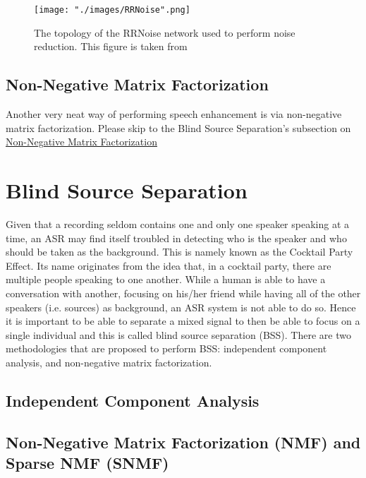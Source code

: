 \begin{figure}[H]
\begin{center}
    \texttt{[image: "./images/RRNoise".png]}
    \caption{The topology of the RRNoise network used to perform noise reduction. This figure is taken from \cite{rrnoise}}
    \label{fig::RRNoisearch}
\end{center}
\end{figure}

\subsection{Non-Negative Matrix Factorization}
Another very neat way of performing speech enhancement is via non-negative matrix factorization. Please skip to the Blind Source Separation's subsection on \hyperref[sec:NMF]{Non-Negative Matrix Factorization} \cite{spectralclustering}

\section{Blind Source Separation}
Given that a recording seldom contains one and only one speaker speaking at a time, an ASR may find itself troubled in detecting who is the speaker and who should be taken as the background. This is namely known as the Cocktail Party Effect. Its name originates from the idea that, in a cocktail party, there are multiple people speaking to one another. While a human is able to have a conversation with another, focusing on his/her friend while having all of the other speakers (i.e. sources) as background, an ASR system is not able to do so. Hence it is important to be able to separate a mixed signal to then be able to focus on a single individual and this is called blind source separation (BSS). There are two methodologies that are proposed to perform BSS: independent component analysis, and non-negative matrix factorization.


\subsection{Independent Component Analysis}
\subsection{Non-Negative Matrix Factorization (NMF) and Sparse NMF (SNMF)} \label{sec:NMF}

